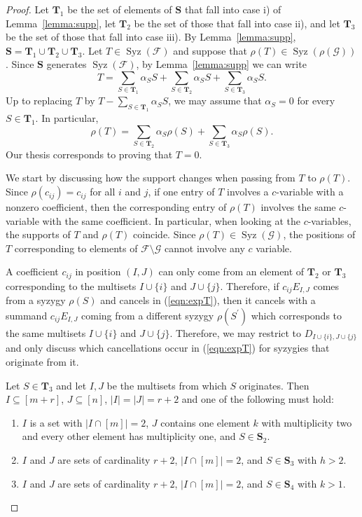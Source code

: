 \documentclass[utf8,latin1]{article}
\DeclareMathOperator{\Syz}{Syz}
\begin{document}
\begin{proof} 
Let $\mathbf{T}_1$ be the set of elements of $\mathbf{S}$ that fall into case i) of Lemma~\ref{lemma:supp}, let $\mathbf{T}_2$ be the set of those that fall into case ii), and let $\mathbf{T}_3$ be the set of those that fall into case iii). By Lemma~\ref{lemma:supp}, $\mathbf{S}=\mathbf{T}_1\cup\mathbf{T}_2\cup\mathbf{T}_3$. 
Let $T\in \Syz(\mathcal{F})$ and suppose that $\rho(T)\in \Syz(\rho(\mathcal{G}))$.
Since $\mathbf{S}$ generates $\Syz(\mathcal{F})$, by Lemma~\ref{lemma:supp} we can write
\begin{equation}\label{eqn:expT}
T=\sum_{S\in\mathbf{T}_1}\alpha_S S + 
\sum_{S\in\mathbf{T}_2}\alpha_S S + 
\sum_{S\in\mathbf{T}_3} \alpha_S S.
\end{equation}
Up to replacing $T$ by $T-\sum_{S\in\mathbf{T}_1}\alpha_S S$, we may assume that $\alpha_S=0$ for every $S\in\mathbf{T}_1$. In particular,
\begin{equation}\label{eqn:rhoT}
\rho(T) = \sum_{S\in\mathbf{T}_2}\alpha_S \rho(S) + 
\sum_{S\in\mathbf{T}_3} \alpha_S\rho(S).
\end{equation}
Our thesis corresponds to proving that $T=0$. 

We start by discussing how the support changes when passing from $T$ to $\rho(T)$. Since $\rho(c_{ij})=c_{ij}$ for all $i$ and $j$, if one entry of $T$ involves a $c$-variable with a nonzero coefficient, then the corresponding entry of $\rho(T)$ involves the same $c$-variable with the same coefficient. In particular, when looking at the $c$-variables, the supports of $T$ and $\rho(T)$ coincide. Since $\rho(T)\in\Syz(\mathcal{G})$, the positions of $T$ corresponding to elements of $\mathcal{F}\setminus\mathcal{G}$ cannot involve any $c$ variable.

A coefficient $c_{ij}$ in position $(I,J)$ can only come from an element of $\mathbf{T}_2$ or $\mathbf{T}_3$ corresponding to the multisets $I\cup\{i\}$ and $J\cup\{j\}$. Therefore, if $c_{ij}E_{I,J}$ comes from a syzygy $\rho(S)$ and cancels in (\ref{eqn:expT}), then it cancels with a summand $c_{ij}E_{I,J}$ coming from a different syzygy $\rho(S^\prime)$ which corresponds to the same multisets $I\cup\{i\}$ and $J\cup\{j\}$. Therefore, we may restrict to $D_{I\cup\{i\},J\cup\{j\}}$ and only discuss which cancellations occur in (\ref{eqn:expT}) for syzygies that originate from it. 

Let $S\in\mathbf{T}_3$ and let $I,J$ be the multisets from which $S$ originates. Then $I\subseteq[m+r]$, $J\subseteq[n]$, $|I|=|J|=r+2$ and one of the following must hold:
\begin{enumerate}
\item $I$ is a set with $|I\cap[m]|=2$, $J$ contains one element $k$ with multiplicity two and every other element has multiplicity one,  and $S\in\mathbf{S}_2$.
\item $I$ and $J$ are sets of cardinality $r+2$, $|I\cap[m]|=2$, and $S\in\mathbf{S}_3$ with $h>2$.
\item $I$ and $J$ are sets of cardinality $r+2$, $|I\cap[m]|=2$, and $S\in\mathbf{S}_4$ with $k>1$.
\end{enumerate}


\end{proof}
\end{document}
